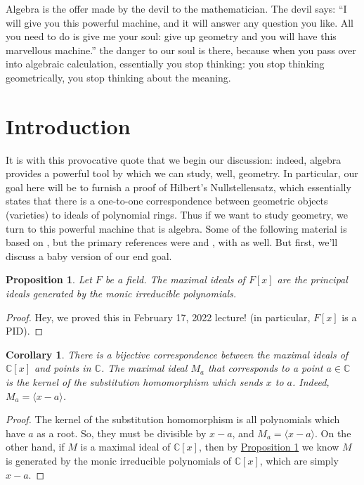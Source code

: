 \documentclass[letterpaper]{article}
\newtheorem{proposition}[theorem]{Proposition}
\newtheorem{corollary}[theorem]{Corollary}
\theoremstyle{definition}
\theoremstyle{remark}
\newcommand\CC{\mathbb{C}}
\begin{document}
\begin{displayquote}
	Algebra is the offer made by the devil to the mathematician. The devil says: ``I will give you this powerful machine, and it will answer any question you like. All you need to do is give me your soul: give up geometry and you will have this marvellous machine.'' \textellipsis the danger to our soul is there, because when you pass over into algebraic calculation, essentially you stop thinking: you stop thinking geometrically, you stop thinking about the meaning.
\end{displayquote}

\section{Introduction}
It is with this provocative quote that we begin our discussion: indeed, algebra provides a powerful tool by which we can study, well, geometry. In particular, our goal here will be to furnish a proof of Hilbert's Nullstellensatz, which essentially states that there is a one-to-one correspondence between geometric objects (varieties) to ideals of polynomial rings. Thus if we want to study geometry, we turn to this powerful machine that is algebra\textellipsis. Some of the following material is based on \cite{artin}, but the primary references were \cite{reid} and \cite{smith}, with \cite{aluffi} as well. But first, we'll discuss a baby version of our end goal. 

\begin{proposition}\label{prop:monicirr}
	Let \(F\) be a field. The maximal ideals of \(F[x]\) are the principal ideals generated by the monic irreducible polynomials. 
\end{proposition}
\begin{proof}
	Hey, we proved this in February 17, 2022 lecture! (in particular, $F[x]$ is a PID).
\end{proof}

\begin{corollary}
	There is a bijective correspondence between the maximal ideals of \(\CC[x]\) and points in \(\CC{}\). The maximal ideal \(M_a\) that corresponds to a point \(a\in\CC\) is the kernel of the substitution homomorphism which sends \(x\) to \(a\). Indeed, \(M_a=\langle x-a\rangle\). 
\end{corollary}

\begin{proof}
	The kernel of the substitution homomorphism is all polynomials which have \(a\) as a root. So, they must be divisible by \(x-a\), and \(M_a=\langle x-a\rangle\). On the other hand, if \(M\) is a maximal ideal of \(\CC[x]\), then by \hyperref[prop:monicirr]{Proposition \ref*{prop:monicirr}} we know \(M\) is generated by the monic irreducible polynomials of \(\CC[x]\), which are simply \(x-a\). 
\end{proof}
\end{document}

